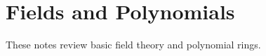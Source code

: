 \section{Fields and Polynomials}
\label{sec:fields-polynomials}

These notes review basic field theory and polynomial rings.
